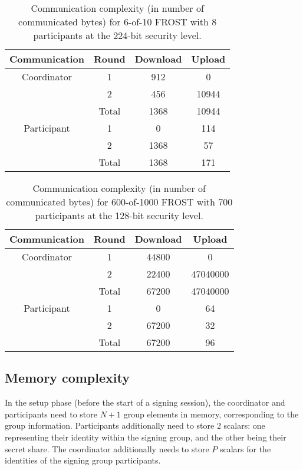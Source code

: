 \begin{table}
	\centering
	\begin{tabular}{c c c c}
		\toprule
		Communication & Round & Download & Upload \\ \midrule
		Coordinator & 1 & 912 & 0 \\
		            & 2 & 456 & 10944 \\
		            & Total & 1368 & 10944 \\
		\midrule
		Participant & 1 & 0 & 114 \\
		            & 2 & 1368 & 57 \\
		            & Total & 1368 & 171 \\
		\bottomrule
	\end{tabular}
	\caption{Communication complexity (in number of communicated bytes) for 6-of-10 FROST with 8 participants at the 224-bit security level.}
\end{table}

\begin{table}
	\centering
	\begin{tabular}{c c c c}
		\toprule
		Communication & Round & Download & Upload \\ \midrule
		Coordinator & 1 & 44800 & 0 \\
		            & 2 & 22400 & 47040000 \\
		            & Total & 67200 & 47040000 \\
		\midrule
		Participant & 1 & 0 & 64 \\
		            & 2 & 67200 & 32 \\
		            & Total & 67200 & 96 \\
		\bottomrule
	\end{tabular}
	\caption{Communication complexity (in number of communicated bytes) for 600-of-1000 FROST with 700 participants at the 128-bit security level.}
\end{table}

\subsection{Memory complexity}

In the setup phase (before the start of a signing session), the coordinator and
participants need to store $N + 1$ group elements in memory, corresponding to
the group information. Participants additionally need to store 2 scalars: one
representing their identity within the signing group, and the other being their
secret share. The coordinator additionally needs to store $P$ scalars for the
identities of the signing group participants.

